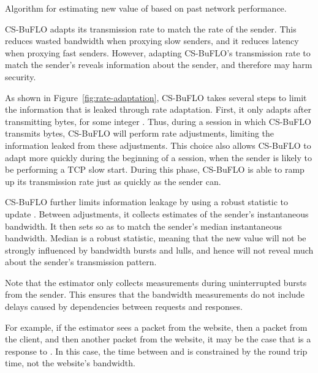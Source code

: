 \documentclass[10pt,journal]{IEEEtran}
\newcommand{\csb} {CS-BuFLO\xspace}
\begin{document}
\begin{algorithm}[t]
  \caption{Algorithm for estimating new value of  based on past network performance.}
  \label{alg:rho-estimator}
  \begin{algorithmic}
    \State 
      \State\Return 
    \Else
      \State\Return
    \EndIf
    \EndFunction
  \end{algorithmic}
\end{algorithm}


\csb adapts its transmission rate to match the rate of the sender.
This reduces wasted bandwidth when proxying slow senders, and it
reduces latency when proxying fast senders.  However, adapting
\csb's transmission rate to match the sender's reveals information
about the sender, and therefore may harm security.

As shown in Figure~\ref{fig:rate-adaptation}, \csb takes several steps to limit
the information that is leaked through rate adaptation.  First, it only adapts
after transmitting  bytes, for some integer .  Thus, during a session
in which \csb transmits  bytes, \csb will perform  rate
adjustments, limiting the information leaked from these adjustments.  This
choice also allows \csb to adapt more quickly during the beginning of a
session, when the sender is likely to be performing a TCP slow start.  During
this phase, \csb is able to ramp up its transmission rate just as quickly as
the sender can.

\csb further limits
information leakage by using a robust statistic to update .
Between adjustments, it collects estimates of the sender's
instantaneous bandwidth. It then sets  so as to match the
sender's median instantaneous bandwidth.  Median is a robust
statistic, meaning that the new  value will not be strongly
influenced by bandwidth bursts and lulls, and hence  will not
reveal much about the sender's transmission pattern.

Note that the estimator only collects measurements during
uninterrupted bursts from the sender.  This ensures that the bandwidth
measurements do not include delays caused by dependencies between
requests and responses.  

For example, if the estimator sees a packet
 from the website, then a packet  from the client, and then
another packet  from the website, it may be the case that  is
a response to .  In this case, the time between  and 
is constrained by the round trip time, not the website's bandwidth.
\end{document}
